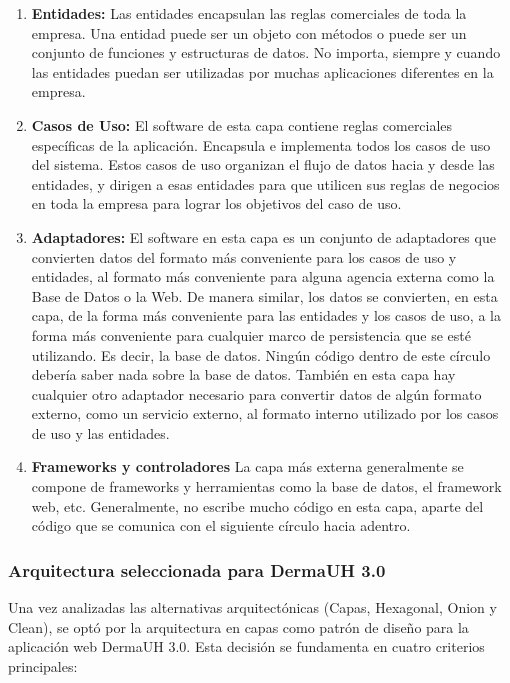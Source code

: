 \begin{enumerate}
    \item \textbf{Entidades:} Las entidades encapsulan las reglas comerciales de toda la empresa. Una entidad puede ser un objeto con métodos o puede ser un conjunto de funciones y estructuras de datos. No importa, siempre y cuando las entidades puedan ser utilizadas por muchas aplicaciones diferentes en la empresa.
    \item \textbf{Casos de Uso:} El software de esta capa contiene reglas comerciales específicas de la aplicación. Encapsula e implementa todos los casos de uso del sistema. Estos casos de uso organizan el flujo de datos hacia y desde las entidades, y dirigen a esas entidades para que utilicen sus reglas de negocios en toda la empresa para lograr los objetivos del caso de uso.
    \item \textbf{Adaptadores:} El software en esta capa es un conjunto de adaptadores que convierten datos del formato más conveniente para los casos de uso y entidades, al formato más conveniente para alguna agencia externa como la Base de Datos o la Web. De manera similar, los datos se convierten, en esta capa, de la forma más conveniente para las entidades y los casos de uso, a la forma más conveniente para cualquier marco de persistencia que se esté utilizando. Es decir, la base de datos. Ningún código dentro de este círculo debería saber nada sobre la base de datos. También en esta capa hay cualquier otro adaptador necesario para convertir datos de algún formato externo, como un servicio externo, al formato interno utilizado por los casos de uso y las entidades.
    \item \textbf{Frameworks y controladores} La capa más externa generalmente se compone de frameworks y herramientas como la base de datos, el framework web, etc. Generalmente, no escribe mucho código en esta capa, aparte del código que se comunica con el siguiente círculo hacia adentro.
\end{enumerate}

\subsubsection{Arquitectura seleccionada para DermaUH 3.0}

Una vez analizadas las alternativas arquitectónicas (Capas, Hexagonal, Onion y Clean), 
se optó por la arquitectura en capas como patrón de diseño para la aplicación web DermaUH 3.0. 
Esta decisión se fundamenta en cuatro criterios principales:

